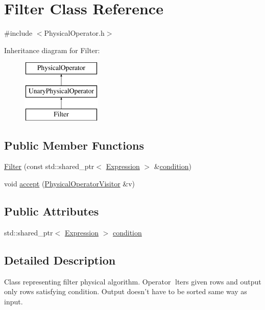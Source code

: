 \hypertarget{class_filter}{\section{Filter Class Reference}
\label{class_filter}
}


{\ttfamily \#include $<$Physical\+Operator.\+h$>$}

Inheritance diagram for Filter\+:\begin{figure}[H]
\begin{center}
\leavevmode
\includegraphics[height=3.000000cm]{class_filter}
\end{center}
\end{figure}
\subsection*{Public Member Functions}
\begin{DoxyCompactItemize}
\item 
\hyperlink{class_filter_a4e75723e5596f5b77b84a395c7453853}{Filter} (const std\+::shared\+\_\+ptr$<$ \hyperlink{class_expression}{Expression} $>$ \&\hyperlink{class_filter_acc551fc888d4b2e9bc36364a3877dbb8}{condition})
\item 
void \hyperlink{class_filter_a1df50e05d64ad3b2cc45d2f9e28127c4}{accept} (\hyperlink{class_physical_operator_visitor}{Physical\+Operator\+Visitor} \&v)
\end{DoxyCompactItemize}
\subsection*{Public Attributes}
\begin{DoxyCompactItemize}
\item 
std\+::shared\+\_\+ptr$<$ \hyperlink{class_expression}{Expression} $>$ \hyperlink{class_filter_acc551fc888d4b2e9bc36364a3877dbb8}{condition}
\end{DoxyCompactItemize}


\subsection{Detailed Description}
Class representing filter physical algorithm. Operator lters given rows and output only rows satisfying condition. Output doesn't have to be sorted same way as input. 


